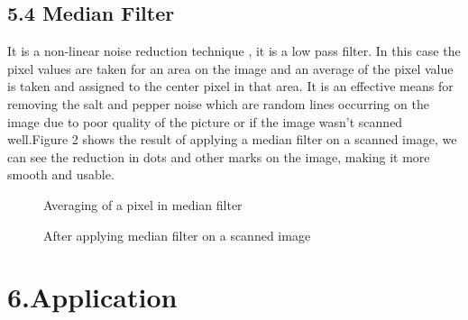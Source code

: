\documentclass[9pt,twocolumn,twoside]{../../styles/osajnl}
\begin{document}
\subsection{5.4 Median Filter}
It is a non-linear noise reduction technique , it is a low pass
filter. In this case the pixel values are taken for an area on the
image and an average of the pixel value is taken and assigned to the
center pixel in that area. It is an effective means for removing the
salt and pepper noise which are random lines occurring on the image
due to poor quality of the picture or if the image wasn’t scanned
well.\cite{medianfilterpreprocessing}Figure 2 shows the result of
applying a median filter on a scanned image, we can see the reduction
in dots and other marks on the image, making it more smooth and
usable.
 

\begin{figure}
\centering
{}
\caption{Averaging of a pixel in median filter}\cite{medianfilterpreprocessing}
\label{fig:Illustration of an OCR system}
\end{figure}

\begin{figure}
\centering
{}
\caption{After applying median filter on a scanned image}
\label{fig:Illustration of an OCR system}
\end{figure}

\section{6.Application}
\end{document}
